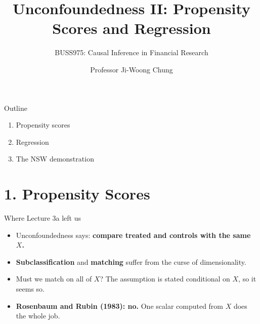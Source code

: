 \documentclass[
  11pt,
  ignorenonframetext,
  aspectratio=169,
]{beamer}
\title{\texorpdfstring{Unconfoundedness II: Propensity Scores and
Regression}{Unconfoundedness II: Propensity Scores and Regression}}
\subtitle{\texorpdfstring{BUSS975: Causal Inference in Financial
Research}{BUSS975: Causal Inference in Financial Research}}
\author{Professor Ji-Woong Chung}
\date{}
\institute{Korea University}
\providecommand{\tightlist}{%
  \setlength{\itemsep}{0pt}\setlength{\parskip}{0pt}}
\begin{document}
\frame{\titlepage}


\begin{frame}{Outline}
\protect{}\label{outline}
\begin{enumerate}
\tightlist
\item
  Propensity scores
\item
  Regression
\item
  The NSW demonstration
\end{enumerate}
\end{frame}

\section{1. Propensity Scores}\label{propensity-scores}

\begin{frame}{Where Lecture 3a left us}
\protect{}\label{where-lecture-3a-left-us}
\begin{itemize}
\tightlist
\item
  Unconfoundedness says: \textbf{compare treated and controls with the
  same \(X\).}
\item
  \textbf{Subclassification} and \textbf{matching} suffer from the curse
  of dimensionality.
\item
  Must we match on all of \(X\)? The assumption is stated conditional on
  \(X\), so it seems so.
\item
  \textbf{Rosenbaum and Rubin (1983): no.} One scalar computed from
  \(X\) does the whole job.
\end{itemize}
\end{frame}
\end{document}

